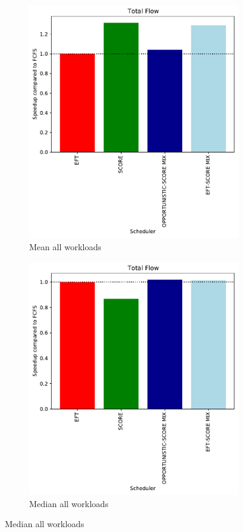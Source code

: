 \documentclass[a4paper]{article}
\begin{document}
\begin{figure}[H]\centering
\begin{subfigure}[b]{0.4\linewidth}\centering\includegraphics[width=1\linewidth]{MBSS/plot/Results_Percentage_FCFS_All_workloads_mean_Total_flow_450_128_32_256_4_1024.pdf}\caption{Mean all workloads}\end{subfigure}
\begin{subfigure}[b]{0.4\linewidth}\centering\includegraphics[width=1\linewidth]{MBSS/plot/Results_Percentage_FCFS_All_workloads_mediane_Total_flow_450_128_32_256_4_1024.pdf}\caption{Median all workloads}\end{subfigure}

\end{figure}
\end{document}
